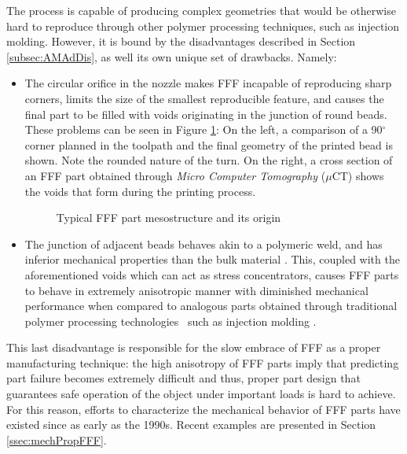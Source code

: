 \documentclass[main.tex]{subfiles}
\begin{document}
The process is capable of producing complex geometries that would be otherwise hard to reproduce through other polymer processing techniques, such as injection molding. However, it is bound by the disadvantages described in Section \ref{subsec:AMAdDis}, as well its own unique set of drawbacks. Namely:

\begin{itemize}
	\item The circular orifice in the nozzle makes FFF incapable of reproducing sharp corners, limits the size of the smallest reproducible feature, and causes the final part to be filled with voids \textendash originating in the junction of round beads. These problems can be seen in Figure \ref{fig:FFFpartprob}: On the left, a comparison of a 90$^\circ$ corner planned in the toolpath and the final geometry of the printed bead is shown. Note the rounded nature of the turn. On the right, a cross section of an FFF part obtained through \emph{Micro Computer Tomography} ($\mu$CT) shows the voids that form during the printing process.
	\begin{figure}[h]
		\center
		\hfill
		\caption{Typical FFF part mesostructure and its origin} \label{fig:FFFpartprob}
	\end{figure}
	\item The junction of adjacent beads behaves akin to a polymeric weld, and has inferior mechanical properties than the bulk material \cite{Capote2017}. This, coupled with the aforementioned voids which can act as stress concentrators, causes FFF parts to behave in extremely anisotropic manner with diminished mechanical performance when compared to analogous parts obtained through traditional polymer processing technologies \textendash~such as injection molding \cite{Capote2017}.
\end{itemize}

This last disadvantage is responsible for the slow embrace of FFF as a proper manufacturing technique: the high anisotropy of FFF parts imply that predicting part failure becomes extremely difficult and thus, proper part design that guarantees safe operation of the object under important loads is hard to achieve.  For this reason, efforts to characterize the mechanical behavior of FFF parts have existed since as early as the 1990s. Recent examples are presented in Section \ref{ssec:mechPropFFF}.
\end{document}
